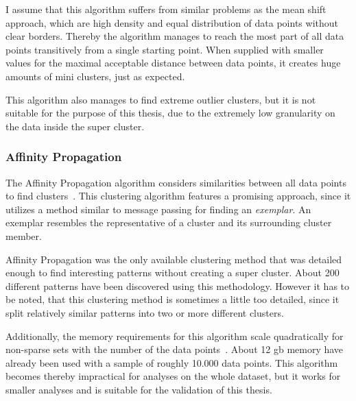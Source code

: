 I assume that this algorithm suffers from similar problems as the mean shift approach, which are high density and equal distribution of data points without clear borders.
Thereby the algorithm manages to reach the most part of all data points transitively from a single starting point.
When supplied with smaller values for the maximal acceptable distance between data points, it creates huge amounts of mini clusters, just as expected.

This algorithm also manages to find extreme outlier clusters, but it is not suitable for the purpose of this thesis, due to the extremely low granularity on the data inside the super cluster.


\subsubsection{Affinity Propagation}
The Affinity Propagation algorithm considers similarities between all data points to find clusters~\cite{article:affinity-propagation}.
This clustering algorithm features a promising approach, since it utilizes a method similar to message passing for finding an \emph{exemplar}.
An exemplar resembles the representative of a cluster and its surrounding cluster member.

Affinity Propagation was the only available clustering method that was detailed enough to find interesting patterns without creating a super cluster.
About 200 different patterns have been discovered using this methodology.
However it has to be noted, that this clustering method is sometimes a little too detailed, since it split relatively similar patterns into two or more different clusters.

Additionally, the memory requirements for this algorithm scale quadratically for non-sparse sets with the number of the data points~\cite[p.~ii]{article:affinity-propagation}.
About 12 \ac{gb} memory have already been used with a sample of roughly 10.000 data points.
This algorithm becomes thereby impractical for analyses on the whole dataset, but it works for smaller analyses and is suitable for the validation of this thesis.

